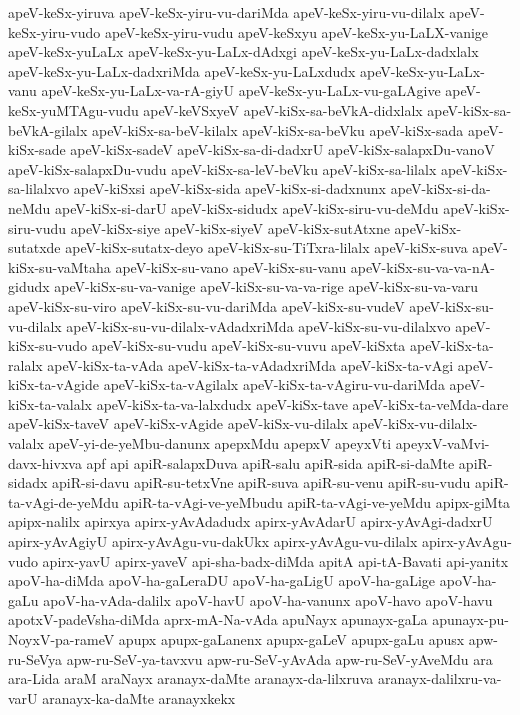 {apeV-keSx-yiruva
apeV-keSx-yiru-vu-dariMda
apeV-keSx-yiru-vu-dilalx
apeV-keSx-yiru-vudo
apeV-keSx-yiru-vudu
apeV-keSxyu
apeV-keSx-yu-LaLX-vanige
apeV-keSx-yuLaLx
apeV-keSx-yu-LaLx-dAdxgi
apeV-keSx-yu-LaLx-dadxlalx
apeV-keSx-yu-LaLx-dadxriMda
apeV-keSx-yu-LaLxdudx
apeV-keSx-yu-LaLx-vanu
apeV-keSx-yu-LaLx-va-rA-giyU
apeV-keSx-yu-LaLx-vu-gaLAgive
apeV-keSx-yuMTAgu-vudu
apeV-keVSxyeV
apeV-kiSx-sa-beVkA-didxlalx
apeV-kiSx-sa-beVkA-gilalx
apeV-kiSx-sa-beV-kilalx
apeV-kiSx-sa-beVku
apeV-kiSx-sada
apeV-kiSx-sade
apeV-kiSx-sadeV
apeV-kiSx-sa-di-dadxrU
apeV-kiSx-salapxDu-vanoV
apeV-kiSx-salapxDu-vudu
apeV-kiSx-sa-leV-beVku
apeV-kiSx-sa-lilalx
apeV-kiSx-sa-lilalxvo
apeV-kiSxsi
apeV-kiSx-sida
apeV-kiSx-si-dadxnunx
apeV-kiSx-si-da-neMdu
apeV-kiSx-si-darU
apeV-kiSx-sidudx
apeV-kiSx-siru-vu-deMdu
apeV-kiSx-siru-vudu
apeV-kiSx-siye
apeV-kiSx-siyeV
apeV-kiSx-sutAtxne
apeV-kiSx-sutatxde
apeV-kiSx-sutatx-deyo
apeV-kiSx-su-TiTxra-lilalx
apeV-kiSx-suva
apeV-kiSx-su-vaMtaha
apeV-kiSx-su-vano
apeV-kiSx-su-vanu
apeV-kiSx-su-va-va-nA-gidudx
apeV-kiSx-su-va-vanige
apeV-kiSx-su-va-va-rige
apeV-kiSx-su-va-varu
apeV-kiSx-su-viro
apeV-kiSx-su-vu-dariMda
apeV-kiSx-su-vudeV
apeV-kiSx-su-vu-dilalx
apeV-kiSx-su-vu-dilalx-vAdadxriMda
apeV-kiSx-su-vu-dilalxvo
apeV-kiSx-su-vudo
apeV-kiSx-su-vudu
apeV-kiSx-su-vuvu
apeV-kiSxta
apeV-kiSx-ta-ralalx
apeV-kiSx-ta-vAda
apeV-kiSx-ta-vAdadxriMda
apeV-kiSx-ta-vAgi
apeV-kiSx-ta-vAgide
apeV-kiSx-ta-vAgilalx
apeV-kiSx-ta-vAgiru-vu-dariMda
apeV-kiSx-ta-valalx
apeV-kiSx-ta-va-lalxdudx
apeV-kiSx-tave
apeV-kiSx-ta-veMda-dare
apeV-kiSx-taveV
apeV-kiSx-vAgide
apeV-kiSx-vu-dilalx
apeV-kiSx-vu-dilalx-valalx
apeV-yi-de-yeMbu-danunx
apepxMdu
apepxV
apeyxVti
apeyxV-vaMvi-davx-hivxva
apf
api
apiR-salapxDuva
apiR-salu
apiR-sida
apiR-si-daMte
apiR-sidadx
apiR-si-davu
apiR-su-tetxVne
apiR-suva
apiR-su-venu
apiR-su-vudu
apiR-ta-vAgi-de-yeMdu
apiR-ta-vAgi-ve-yeMbudu
apiR-ta-vAgi-ve-yeMdu
apipx-giMta
apipx-nalilx
apirxya
apirx-yAvAdadudx
apirx-yAvAdarU
apirx-yAvAgi-dadxrU
apirx-yAvAgiyU
apirx-yAvAgu-vu-dakUkx
apirx-yAvAgu-vu-dilalx
apirx-yAvAgu-vudo
apirx-yavU
apirx-yaveV
api-sha-badx-diMda
apitA
api-tA-Bavati
api-yanitx
apoV-ha-diMda
apoV-ha-gaLeraDU
apoV-ha-gaLigU
apoV-ha-gaLige
apoV-ha-gaLu
apoV-ha-vAda-dalilx
apoV-havU
apoV-ha-vanunx
apoV-havo
apoV-havu
apotxV-padeVsha-diMda
aprx-mA-Na-vAda
apuNayx
apunayx-gaLa
apunayx-pu-NoyxV-pa-rameV
apupx
apupx-gaLanenx
apupx-gaLeV
apupx-gaLu
apusx
apw-ru-SeVya
apw-ru-SeV-ya-tavxvu
apw-ru-SeV-yAvAda
apw-ru-SeV-yAveMdu
ara
ara-Lida
araM
araNayx
aranayx-daMte
aranayx-da-lilxruva
aranayx-dalilxru-va-varU
aranayx-ka-daMte
aranayxkekx
}
